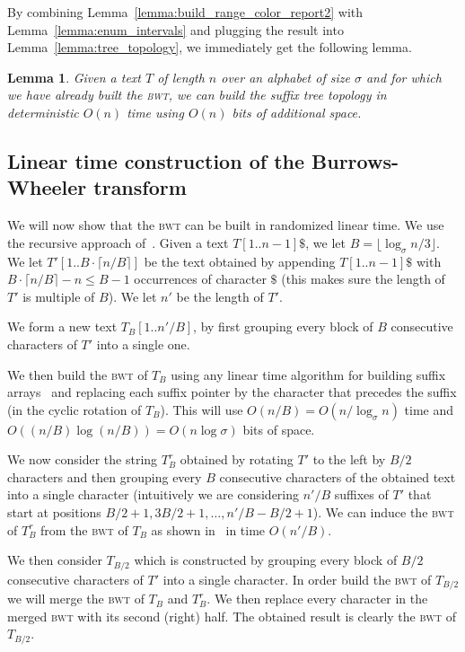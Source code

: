 \documentclass[a4paper]{article}
\newtheorem{lemma}{Lemma}
\begin{document}
By combining Lemma~\ref{lemma:build_range_color_report2} with Lemma~\ref{lemma:enum_intervals} and plugging the result into Lemma~\ref{lemma:tree_topology}, we immediately get the following lemma. 

\begin{lemma}
\label{lemma:tree_topology2}
Given a text $T$ of length $n$ over an alphabet of size $\sigma$ and for which we have already built the \textsc{bwt}, we can build the suffix tree topology in deterministic $O(n)$ time using $O(n)$ bits of additional space. 
\end{lemma}




\subsection{Linear time construction of the Burrows-Wheeler transform}
\label{subsec:linear_time_bwt_build}

We will now show that the \textsc{bwt} can be built in randomized
linear time. We use the recursive approach of~\cite{HSS09}. Given a text $T[1..n-1]\$$,
we let $B=\lfloor\log_\sigma n/3\rfloor$. We let $T'[1..B\cdot \lceil n/B\rceil]$ be
the text obtained by appending $T[1..n-1]\$$ with $B\cdot \lceil n/B\rceil-n\leq B-1$ 
occurrences of character $\$$ (this makes sure the length of $T'$ is multiple of $B$). 
We let $n'$ be the length of $T'$.  


We form a new text $T_B[1..n'/B]$, by first grouping every 
block of $B$ consecutive characters of $T'$ into a single one.

We then build the \textsc{bwt} of $T_B$ using any linear time
algorithm for building suffix arrays~\cite{KA03,KSPP05,KSB06}
and replacing each suffix pointer 
by the character that precedes the suffix (in the cyclic rotation of $T_B$). 
This will use $O(n/B)=O(n/\log_\sigma n)$ time and 
$O((n/B)\log (n/B))=O(n\log\sigma)$ bits of space.

We now consider the string $T^r_B$ obtained by rotating 
$T'$ to the left by $B/2$ characters and then grouping every $B$
consecutive characters of the obtained text into a single character 
(intuitively we are considering $n'/B$ suffixes of $T'$ that start at positions 
$B/2+1,3B/2+1,\ldots,n'/B-B/2+1$). We can induce the \textsc{bwt} of $T^r_B$ 
from the \textsc{bwt} of $T_B$ as shown in~\cite{OS09} in time $O(n'/B)$. 



We then consider $T_{B/2}$ which is constructed by grouping every block 
of $B/2$ consecutive characters of $T'$ into a single character. 
In order build the \textsc{bwt} of $T_{B/2}$ we will merge 
the \textsc{bwt} of $T_B$ and $T^r_B$. We then replace every character in the merged \textsc{bwt} 
with its second (right) half. The obtained result is clearly
the \textsc{bwt} of $T_{B/2}$. 
\end{document}
